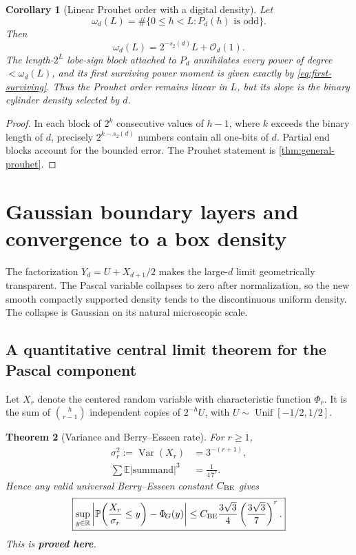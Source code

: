 \documentclass[11pt,oneside]{article}
\numberwithin{equation}{section}
\newtheorem{theorem}{Theorem}[section]
\newtheorem{corollary}[theorem]{Corollary}
\theoremstyle{definition}
\theoremstyle{remark}
\newcommand{\R}{\mathbb R}
\newcommand{\E}{\mathbb E}
\newcommand{\Prob}{\mathbb P}
\newcommand{\Var}{\operatorname{Var}}
\newcommand{\bigO}{\mathcal O}
\newcommand{\statusproved}{\textcolor{deepgreen}{\textbf{proved here}}}
\newcommand{\NormalCDF}{\Phi_{\!G}}
\begin{document}
\begin{corollary}[Linear Prouhet order with a digital density]
\label{cor:Pd-prouhet}
Let
\[
 \omega_d(L)=\#\{0\le h<L:P_d(h)\text{ is odd}\}.
\]
Then
\begin{equation}
 \omega_d(L)=2^{-s_2(d)}L+\bigO_d(1).
 \label{eq:Pd-prouhet-density}
\end{equation}
The length-$2^L$ lobe-sign block attached to $P_d$ annihilates every power of degree
$<\omega_d(L)$, and its first surviving power moment is given exactly by
\eqref{eq:first-surviving}.  Thus the Prouhet order remains linear in $L$, but its slope is
the binary cylinder density selected by $d$.
\end{corollary}

\begin{proof}
In each block of $2^k$ consecutive values of $h-1$, where $k$ exceeds the binary length of
$d$, precisely $2^{k-s_2(d)}$ numbers contain all one-bits of $d$.  Partial end blocks account
for the bounded error.  The Prouhet statement is \cref{thm:general-prouhet}.
\end{proof}


\section{Gaussian boundary layers and convergence to a box density}
\label{sec:boundary}

The factorization $Y_d=U+X_{d+1}/2$ makes the large-$d$ limit geometrically transparent.
The Pascal variable collapses to zero after normalization, so the new smooth compactly
supported density tends to the discontinuous uniform density.  The collapse is Gaussian on
its natural microscopic scale.

\subsection{A quantitative central limit theorem for the Pascal component}

Let $X_r$ denote the centered random variable with characteristic function $\Phi_r$.  It is
the sum of $\binom h{r-1}$ independent copies of $2^{-h}U$, with
$U\sim\operatorname{Unif}[-1/2,1/2]$.

\begin{theorem}[Variance and Berry--Esseen rate]
\label{thm:pascal-BE}
For $r\ge1$,
\begin{align}
 \sigma_r^2:=\Var(X_r)&=3^{-(r+1)},
 \label{eq:pascal-variance}\\
 \sum\E|\text{summand}|^3&=\frac1{4\,7^r}.
 \label{eq:pascal-third-sum}
\end{align}
Hence any valid universal Berry--Esseen constant $C_{\rm BE}$ gives
\begin{equation}
 \boxed{
 \sup_{y\in\R}
 \left|\Prob\!\left(\frac{X_r}{\sigma_r}\le y\right)-\NormalCDF(y)\right|
 \le C_{\rm BE}\frac{3\sqrt3}{4}
       \left(\frac{3\sqrt3}{7}\right)^r.}
 \label{eq:pascal-BE}
\end{equation}
This is \statusproved.
\end{theorem}
\end{document}
